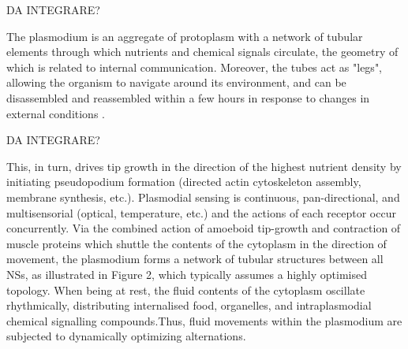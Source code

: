 \par
DA INTEGRARE? 
\par
The plasmodium is an aggregate of protoplasm with a network of tubular elements through which nutrients and chemical signals circulate, the geometry of which is related to internal communication. Moreover, the tubes act as "legs", allowing the organism to navigate around its environment, and can be disassembled and reassembled within a few hours in response to changes in external conditions \cite{nakagaki2004obtaining}.


\par
DA INTEGRARE? 
\par
This, in turn, drives tip growth in the direction of the highest nutrient density by initiating pseudopodium formation (directed actin cytoskeleton assembly, membrane synthesis, etc.). Plasmodial sensing is continuous, pan-directional, and multisensorial (optical, temperature, etc.) and the actions of  each receptor occur concurrently.
Via the combined action of amoeboid tip-growth and contraction of muscle proteins which shuttle the contents of the cytoplasm in the direction of movement, the plasmodium forms a network of tubular structures between all NSs, as illustrated in Figure 2, which typically assumes a highly optimised topology. When being at rest, the fluid contents of  the cytoplasm oscillate rhythmically, distributing internalised food, organelles, and intraplasmodial chemical signalling compounds.Thus, fluid movements within the plasmodium are subjected to dynamically optimizing alternations.


